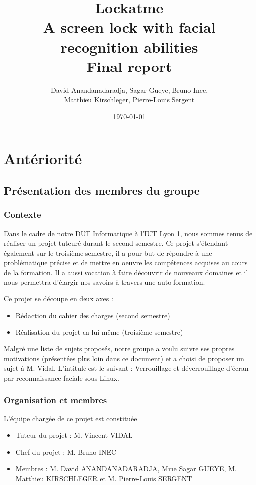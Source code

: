 \documentclass[french]{report}
\title{Lockatme\\A screen lock with facial recognition abilities\\Final report}
\date{\today}
\author{David Anandanadaradja, Sagar Gueye, Bruno Inec,\\ Matthieu Kirschleger,
Pierre-Louis Sergent}
\begin{document}
    \maketitle

    \tableofcontents

\chapter{Antériorité}
\newpage

\section{Présentation des membres du groupe}

\subsection{Contexte}
Dans le cadre de notre DUT Informatique à l’IUT Lyon 1, nous sommes tenus de
réaliser un projet tuteuré durant le second semestre. Ce projet s’étendant
également sur le troisième semestre, il a pour but de répondre à une
problématique précise et de mettre en oeuvre les compétences acquises au cours
de la formation. Il a aussi vocation à faire découvrir de nouveaux domaines et
il nous permettra d’élargir nos savoirs à travers une auto-formation.

\vspace{0.5cm}
Ce projet se découpe en deux axes :
\begin{itemize}
  \item{Rédaction du cahier des charges (second semestre)}
  \item{Réalisation du projet en lui même (troisième semestre)}
\end{itemize}
\vspace{0.5cm}

Malgré une liste de sujets proposés, notre groupe a voulu suivre ses propres
motivations (présentées plus loin dans ce document) et a choisi de proposer un
sujet à M. Vidal. L’intitulé est le suivant : Verrouillage et déverrouillage
d’écran par reconnaissance faciale sous Linux.

\subsection{Organisation et membres}
L’équipe chargée de ce projet est constituée
\begin{itemize}
  \item{Tuteur du projet : M. Vincent VIDAL}
  \item{Chef du projet : M. Bruno INEC}
  \item{Membres : M. David ANANDANADARADJA, Mme Sagar GUEYE, M. Matthieu
        KIRSCHLEGER et M. Pierre-Louis SERGENT}
\end{itemize}
\end{document}
